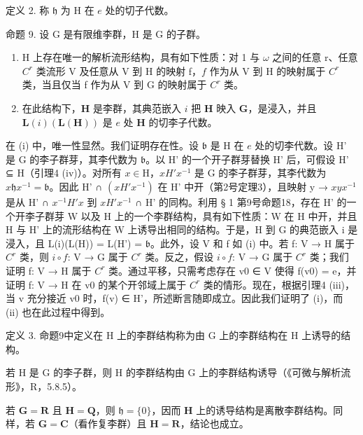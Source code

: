 定义 2. 称 \(\mathfrak{h}\) 为 H 在 \(e\) 处的切子代数。

命题 9. 设 G 是有限维李群，H 是 G 的子群。

\begin{enumerate}
\def\labelenumi{(\roman{enumi})}
\item
  H 上存在唯一的解析流形结构，具有如下性质：对 1 与 \(\omega\) 之间的任意 r、任意 \(C^r\) 类流形 V 及任意从 V 到 H 的映射 f，\(f\) 作为从 V 到 H 的映射属于 \(C^r\) 类，当且仅当 f 作为从 V 到 G 的映射属于 \(C^r\) 类。
\item
  在此结构下，\(\mathbf{H}\) 是李群，其典范嵌入 \(i\) 把 \(\mathbf{H}\) 映入 \(\mathbf{G}\)，是浸入，并且 \(\mathbf{L}(i)(\mathbf{L}(\mathbf{H}))\) 是 \(e\) 处 \(\mathbf{H}\) 的切李子代数。
\end{enumerate}

在 (i) 中，唯一性显然。我们证明存在性。设 \(\mathfrak{b}\) 是 H 在 \(e\) 处的切李代数。设 H' 是 G 的李子群芽，其李代数为 \(\mathfrak{b}\)。以 H' 的一个开子群芽替换 H' 后，可假设 H' ⊆ H（引理4 (iv)）。对所有 \(x \in \mathrm{H}\)，\(xH'x^{-1}\) 是 G 的李子群芽，其李代数为 \(x \mathfrak{h}x^{-1} = \mathfrak{b}\)。因此 H' ∩ \((xH'x^{-1})\) 在 H' 中开（第2号定理3），且映射 y → \(xyx^{-1}\) 是从 H' ∩ \(x^{-1}H'x\) 到 \(xH'x^{-1}\) ∩ H' 的同构。利用 § 1 第9号命题18，存在 H' 的一个开李子群芽 W 以及 H 上的一个李群结构，具有如下性质：W 在 H 中开，并且 H 与 H' 上的流形结构在 W 上诱导出相同的结构。于是，H 到 G 的典范嵌入 i 是浸入，且 L(i)(L(H)) = L(H') = \(\mathfrak{b}\)。此外，设 V 和 f 如 (i) 中。若 f: V → H 属于 \(C^r\) 类，则 \(i \circ f\): V → G 属于 \(C^r\) 类。反之，假设 \(i \circ f\): V → G 属于 \(C^r\) 类；我们证明 f: V → H 属于 \(C^r\) 类。通过平移，只需考虑存在 v0 ∈ V 使得 f(v0) = e，并证明 f: V → H 在 v0 的某个开邻域上属于 \(C^r\) 类的情形。现在，根据引理4 (iii)，当 v 充分接近 v0 时，f(v) ∈ H'，所述断言随即成立。因此我们证明了 (i)，而 (ii) 也在此过程中得到。

定义 3. 命题9中定义在 H 上的李群结构称为由 G 上的李群结构在 H 上诱导的结构。

若 H 是 G 的李子群，则 H 的李群结构由 G 上的李群结构诱导（《可微与解析流形》，R，5.8.5）。

若 \(\mathbf{G} = \mathbf{R}\) 且 \(\mathbf{H} = \mathbf{Q}\)，则 \(\mathfrak{h} = \{0\}\)，因而 \(\mathbf{H}\) 上的诱导结构是离散李群结构。同样，若 \(\mathbf{G} = \mathbf{C}\)（看作复李群）且 \(\mathbf{H} = \mathbf{R}\)，结论也成立。
